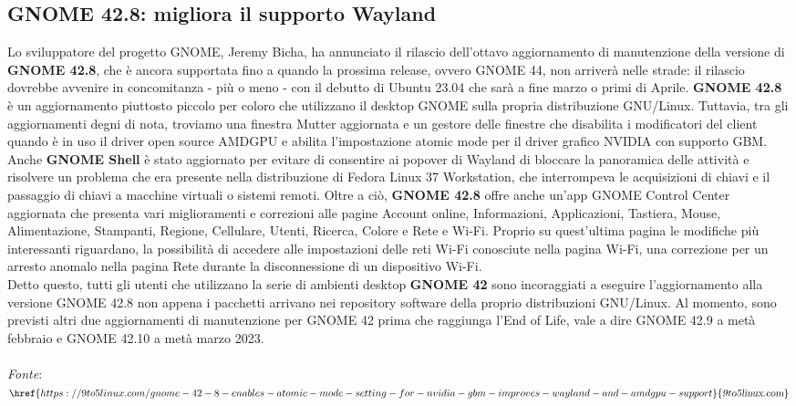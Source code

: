 \documentclass[a4paper,twoside]{article}
\begin{document}
\subsection{GNOME 42.8: migliora il supporto Wayland}
Lo sviluppatore del progetto GNOME, Jeremy Bicha, ha annunciato il rilascio dell'ottavo aggiornamento di manutenzione della versione di \textbf{GNOME 42.8}, che è ancora supportata fino a quando la prossima release, ovvero GNOME 44, non arriverà nelle strade: il rilascio dovrebbe avvenire in concomitanza - più o meno - con il debutto di Ubuntu 23.04 che sarà a fine marzo o primi di Aprile. \textbf{GNOME 42.8} è un aggiornamento piuttosto piccolo per coloro che utilizzano il desktop GNOME sulla propria distribuzione GNU/Linux. Tuttavia, tra gli aggiornamenti degni di nota, troviamo una finestra Mutter aggiornata e un gestore delle finestre che disabilita i modificatori del client quando è in uso il driver open source AMDGPU e abilita l'impostazione atomic mode per il driver grafico NVIDIA con supporto GBM.\\
Anche \textbf{GNOME Shell} è stato aggiornato per evitare di consentire ai popover di Wayland di bloccare la panoramica delle attività e risolvere un problema che era presente nella distribuzione di Fedora Linux 37 Workstation, che interrompeva le acquisizioni di chiavi e il passaggio di chiavi a macchine virtuali o sistemi remoti. Oltre a ciò, \textbf{GNOME 42.8} offre anche un'app GNOME Control Center aggiornata che presenta vari miglioramenti e correzioni alle pagine Account online, Informazioni, Applicazioni, Tastiera, Mouse, Alimentazione, Stampanti, Regione, Cellulare, Utenti, Ricerca, Colore e Rete e Wi-Fi. Proprio su quest'ultima pagina le modifiche più interessanti riguardano, la possibilità di accedere alle impostazioni delle reti Wi-Fi conosciute nella pagina Wi-Fi, una correzione per un arresto anomalo nella pagina Rete durante la disconnessione di un dispositivo Wi-Fi.\\
Detto questo, tutti gli utenti che utilizzano la serie di ambienti desktop \textbf{GNOME 42} sono incoraggiati a eseguire l'aggiornamento alla versione GNOME 42.8 non appena i pacchetti arrivano nei repository software della proprio distribuzioni GNU/Linux. Al momento, sono previsti altri due aggiornamenti di manutenzione per GNOME 42 prima che raggiunga l'End of Life, vale a dire GNOME 42.9 a metà febbraio e GNOME 42.10 a metà marzo 2023.\\
\\
\textit{Fonte}:\\
$\href{https://9to5linux.com/gnome-42-8-enables-atomic-mode-setting-for-nvidia-gbm-improves-wayland-and-amdgpu-support}{\textsl{9to5linux.com}}$
\end{document}
